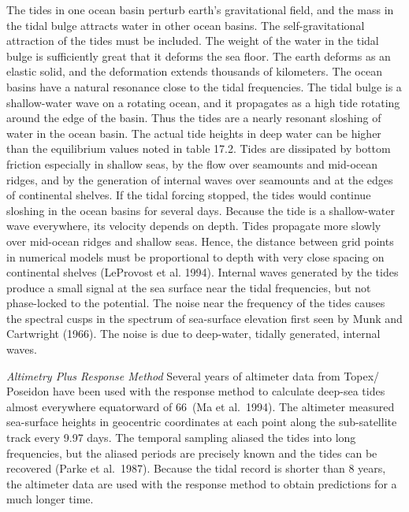 \begin{enumerate}
\vitem
The tides in one ocean basin perturb earth's gravitational field, and the mass in
the tidal bulge attracts water in other ocean basins. The self-gravitational
attraction of the tides must be included.
\vitem
The weight of the water in the tidal bulge is sufficiently great that it deforms
the sea floor. The earth deforms as an elastic solid, and the deformation extends
thousands of kilometers.
\vitem
The ocean basins have a natural resonance close to the tidal frequencies. The tidal
bulge is a shallow-water wave on a rotating ocean, and it propagates as a high tide
rotating around the edge of the basin. Thus the tides are a nearly resonant
sloshing of water in the ocean basin. The actual tide heights in deep water can be
higher than the equilibrium values noted in table 17.2.
\vitem
Tides are dissipated by bottom friction especially in shallow seas, by the flow over
seamounts and mid-ocean ridges, and by the generation of internal waves over
seamounts and at the edges of continental shelves. If the tidal forcing stopped, the
tides would continue sloshing in the ocean basins for several days.
\vitem
Because the tide is a shallow-water wave everywhere, its velocity depends on depth.
Tides propagate more slowly over mid-ocean ridges and shallow seas. Hence, the
distance between grid points in numerical models must be proportional to depth with
very close spacing on continental shelves  (LeProvost et al. 1994).
\vitem
Internal waves generated by the tides produce a small signal at the sea surface
near the tidal frequencies, but not phase-locked to the potential. The noise near
the frequency of the tides causes the spectral cusps in the spectrum of
sea-surface elevation first seen by Munk and Cartwright (1966). The noise is due to
deep-water, tidally generated, internal waves.
\end{enumerate}

\textit{Altimetry Plus Response Method} Several years of altimeter data from
Topex/ Poseidon have been used with the response method to calculate
deep-sea tides almost everywhere equatorward of 66\degrees\ (Ma et al.\ 1994). The altimeter
measured sea-surface heights in geocentric coordinates at each point along the sub-satellite
track every 9.97 days. The temporal sampling aliased the tides into long frequencies, but the
aliased periods are precisely known and the tides can be recovered (Parke et al.\ 1987).
Because the tidal record is shorter than 8 years, the altimeter data are used with
the response method to obtain predictions for a much longer time.

